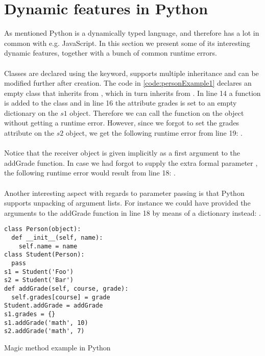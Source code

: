\chapter{Dynamic features in Python}
As mentioned Python is a dynamically typed language, and therefore has a lot in common with e.g. JavaScript. In this section we present some of its interesting dynamic features, together with a bunch of common runtime errors. \\
\\
Classes are declared using the  keyword, supports multiple inheritance and can be modified further after creation. The code in  \ref{code:personExample1} declares an
empty  class that inherits from , which in turn inherits from . In line 14 a function  is added to the  class and in line 16 the attribute grades is set to an empty dictionary on the $s1$ object. Therefore we can call the  function on the  object without getting a runtime error. However, since we forgot to set the grades attribute on the $s2$ object, we get the following runtime error from line 19: . \\
\\
Notice that the receiver object is given implicitly as a first argument to the addGrade function. In case we had forgot to supply the extra formal parameter , the following runtime error would result from line 18: . \\
\\
Another interesting aspect with regards to parameter passing is that Python supports unpacking of argument lists. For instance we could have provided the arguments to the addGrade function in line 18 by means of a dictionary instead: .


\begin{listing}[H]
	\begin{verbatim}
class Person(object):
  def __init__(self, name):
    self.name = name
class Student(Person):
  pass
s1 = Student('Foo')
s2 = Student('Bar')
def addGrade(self, course, grade):
  self.grades[course] = grade
Student.addGrade = addGrade
s1.grades = {}
s1.addGrade('math', 10)
s2.addGrade('math', 7)
	\end{verbatim}
	\caption{Magic method example in Python}\label{code:personExample1}
\end{listing}

